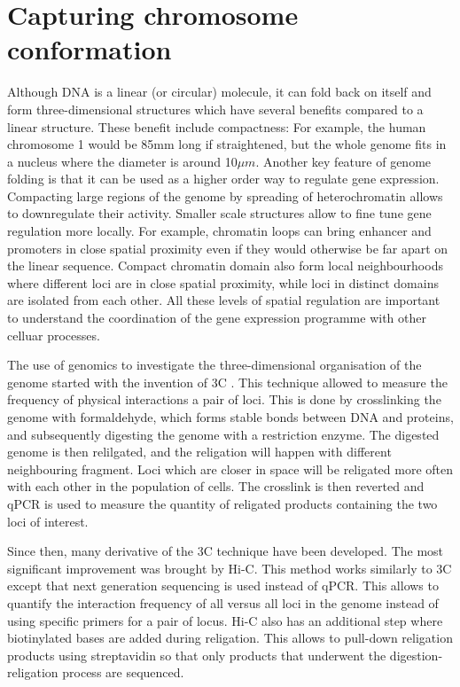 \section{Capturing chromosome conformation}

Although DNA is a linear (or circular) molecule, it can fold back on itself and form three-dimensional structures which have several benefits compared to a linear structure. These benefit include compactness: For example, the human chromosome 1 would be 85mm long if straightened, but the whole genome fits in a nucleus where the diameter is around 10$\mu m$. Another key feature of genome folding is that it can be used as a higher order way to regulate gene expression. Compacting large regions of the genome by spreading of heterochromatin allows to downregulate their activity. Smaller scale structures allow to fine tune gene regulation more locally. For example, chromatin loops can bring enhancer and promoters in close spatial proximity even if they would otherwise be far apart on the linear sequence. Compact chromatin domain also form local neighbourhoods where different loci are in close spatial proximity, while loci in distinct domains are isolated from each other. All these levels of spatial regulation are important to understand the coordination of the gene expression programme with other celluar processes.

The use of genomics to investigate the three-dimensional organisation of the genome started with the invention of \acrfull{3C} \cite{Dekker2002}. This technique allowed to measure the frequency of physical interactions a pair of loci. This is done by crosslinking the genome with formaldehyde, which forms stable bonds between DNA and proteins, and subsequently digesting the genome with a restriction enzyme. The digested genome is then relilgated, and the religation will happen with different neighbouring fragment. Loci which are closer in space will be religated more often with each other in the population of cells. The crosslink is then reverted and qPCR is used to measure the quantity of religated products containing the two loci of interest. 

Since then, many derivative of the \acrshort{3C} technique have been developed. The most significant improvement was brought by Hi-C. This method works similarly to 3C except that next generation sequencing is used instead of qPCR. This allows to quantify the interaction frequency of all versus all loci in the genome instead of using specific primers for a pair of locus. Hi-C also has an additional step where biotinylated bases are added during religation. This allows to pull-down religation products using streptavidin so that only products that underwent the digestion-religation process are sequenced.

